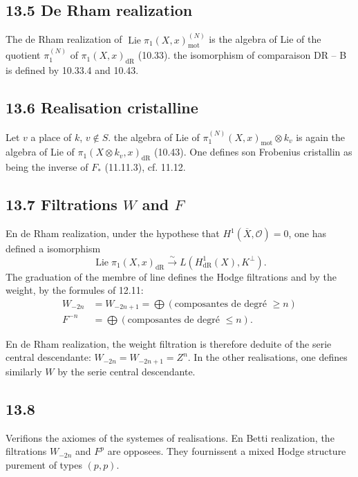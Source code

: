\documentclass[12pt,a4paper]{article}
\theoremstyle{plain}
\theoremstyle{definition}
\theoremstyle{remark}
\DeclareMathOperator{\Lie}{Lie}
\newcommand{\cO}{\mathcal{O}}
\newcommand{\dr}{\mathrm{dR}}
\newcommand{\mot}{\mathrm{mot}}
\begin{document}
\subsection*{13.5 De Rham realization}

The de Rham realization of $\Lie \pi_1(X,x)_{\mot}^{(N)}$ is the algebra of Lie of the quotient $\pi_1^{(N)}$ of $\pi_1(X,x)_{\dr}$ (10.33). the isomorphism of comparaison DR -- B is defined by 10.33.4 and 10.43.

\subsection*{13.6 Realisation cristalline}

Let $v$ a place of $k$, $v \notin S$. the algebra of Lie of $\pi_1^{(N)}(X,x)_{\mot} \otimes k_v$ is again the algebra of Lie of $\pi_1(X \otimes k_v, x)_{\dr}$ (10.43). One defines son Frobenius cristallin as being the inverse of $F_*$ (11.11.3), cf. 11.12.

\subsection*{13.7 Filtrations $W$ and $F$}

En de Rham realization, under the hypothese that $H^1(\overline{X}, \cO) = 0$, one has defined a isomorphism
\[
\Lie \pi_1(X,x)_{\dr} \xrightarrow{\sim} L(H_{\dr}^1(X), K^\perp).
\]
The graduation of the membre of line defines the Hodge filtrations and by the weight, by the formules of 12.11:
\begin{align*}
W_{-2n} &= W_{-2n+1} = \textstyle\bigoplus (\text{composantes de degré } \geqslant n) \\
F^{-n} &= \textstyle\bigoplus (\text{composantes de degré } \leqslant n).
\end{align*}

En de Rham realization, the weight filtration is therefore deduite of the serie central descendante: $W_{-2n} = W_{-2n+1} = Z^n$. In the other realisations, one defines similarly $W$ by the serie central descendante.

\subsection*{13.8}

Verifions the axiomes of the systemes of realisations. En Betti realization, the filtrations $W_{-2n}$ and $F^p$ are opposees. They fournissent a mixed Hodge structure purement of types $(p,p)$.
\end{document}
